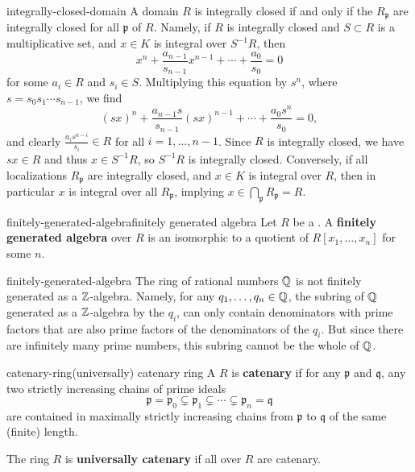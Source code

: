 \begin{example}{integrally-closed-domain}
    A domain $R$ is integrally closed if and only if the  $R_\mathfrak{p}$ are integrally closed for all  $\mathfrak{p}$ of $R$. Namely, if $R$ is integrally closed and $S \subset R$ is a multiplicative set, and $x \in K$ is integral over $S^{-1} R$, then
    \[ x^n + \frac{a_{n - 1}}{s_{n - 1}} x^{n - 1} + \cdots + \frac{a_0}{s_0} = 0 \]
    for some $a_i \in R$ and $s_i \in S$. Multiplying this equation by $s^n$, where $s = s_0 s_1 \cdots s_{n - 1}$, we find
    \[ (sx)^n + \frac{a_{n - 1} s}{s_{n - 1}} (sx)^{n - 1} + \cdots + \frac{a_0 s^n}{s_0} = 0 , \]
    and clearly $\frac{a_i s^{n - i}}{s_i} \in R$ for all $i = 1, \ldots, n - 1$. Since $R$ is integrally closed, we have $sx \in R$ and thus $x \in S^{-1} R$, so $S^{-1} R$ is integrally closed. Conversely, if all localizations $R_\mathfrak{p}$ are integrally closed, and $x \in K$ is integral over $R$, then in particular $x$ is integral over all $R_\mathfrak{p}$, implying $x \in \bigcap_{\mathfrak{p}} R_\mathfrak{p} = R$.
\end{example}

\begin{topic}{finitely-generated-algebra}{finitely generated algebra}
    Let $R$ be a . A \textbf{finitely generated algebra} over $R$ is an  isomorphic to a quotient of $R[x_1, \ldots, x_n]$ for some $n$.
\end{topic}

\begin{example}{finitely-generated-algebra}
    The ring of rational numbers $\mathbb{Q}$ is not finitely generated as a $\mathbb{Z}$-algebra. Namely, for any $q_1, \ldots, q_n \in \mathbb{Q}$, the subring of $\mathbb{Q}$ generated as a $\mathbb{Z}$-algebra by the $q_i$, can only contain denominators with prime factors that are also prime factors of the denominators of the $q_i$. But since there are infinitely many prime numbers, this subring cannot be the whole of $\mathbb{Q}$.
\end{example}

\begin{topic}{catenary-ring}{(universally) catenary ring}
    A  $R$ is \textbf{catenary} if for any  $\mathfrak{p}$ and $\mathfrak{q}$, any two strictly increasing chains of prime ideals
    \[ \mathfrak{p} = \mathfrak{p}_0 \subsetneq \mathfrak{p}_1 \subsetneq \cdots \subsetneq \mathfrak{p}_n = \mathfrak{q} \]
    are contained in maximally strictly increasing chains from $\mathfrak{p}$ to $\mathfrak{q}$ of the same (finite) length.
    
    The ring $R$ is \textbf{universally catenary} if all  over $R$ are catenary.
\end{topic}

